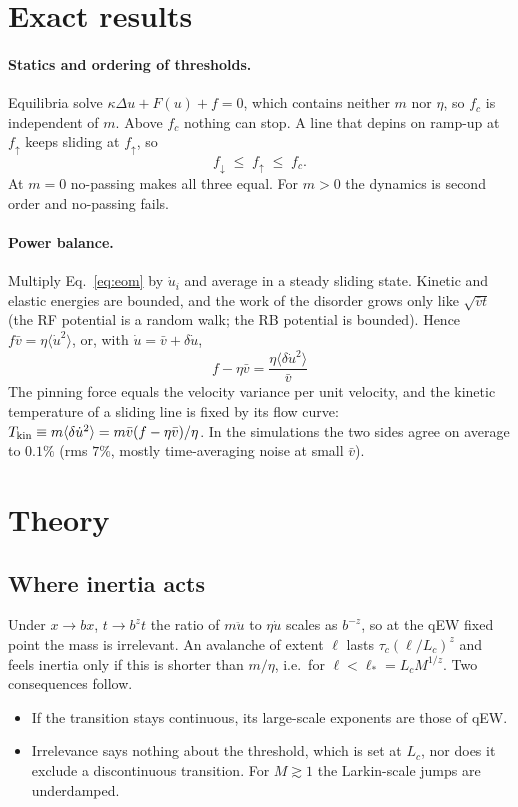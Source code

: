 \documentclass[10pt,a4paper]{article}
\newcommand{\fd}{f_\downarrow}
\newcommand{\fu}{f_\uparrow}
\newcommand{\fcs}{f_c}
\begin{document}
\section{Exact results}
\label{sec:exact}

\paragraph{Statics and ordering of thresholds.}
Equilibria solve $\kappa\Delta u+F(u)+f=0$, which contains neither $m$ nor $\eta$, so $\fcs$ is independent of $m$.
Above $\fcs$ nothing can stop.
A line that depins on ramp-up at $\fu$ keeps sliding at $\fu$, so
\begin{equation}
\fd\;\le\;\fu\;\le\;\fcs .
\end{equation}
At $m=0$ no-passing makes all three equal. For $m>0$ the dynamics is second order and no-passing fails.

\paragraph{Power balance.}
Multiply Eq.~\eqref{eq:eom} by $\dot u_i$ and average in a steady sliding state.
Kinetic and elastic energies are bounded, and the work of the disorder grows only like $\sqrt{\bar vt}$ (the RF potential is a random walk; the RB potential is bounded).
Hence $f\bar v=\eta\langle\dot u^2\rangle$, or, with $\dot u=\bar v+\delta\dot u$,
\begin{equation}
\boxed{\;f-\eta\bar v=\frac{\eta\langle\delta\dot u^2\rangle}{\bar v}\;}
\label{eq:identity}
\end{equation}
The pinning force equals the velocity variance per unit velocity, and the kinetic temperature of a sliding line is fixed by its flow curve: $T_{\rm kin}\equiv m\langle\delta\dot u^2\rangle=m\bar v(f-\eta\bar v)/\eta$.
In the simulations the two sides agree on average to $0.1\%$ (rms $7\%$, mostly time-averaging noise at small $\bar v$).

\section{Theory}
\label{sec:theory}

\subsection{Where inertia acts}

Under $x\to bx$, $t\to b^zt$ the ratio of $m\ddot u$ to $\eta\dot u$ scales as $b^{-z}$, so at the qEW fixed point the mass is irrelevant.
An avalanche of extent $\ell$ lasts $\tau_c(\ell/L_c)^z$ and feels inertia only if this is shorter than $m/\eta$, i.e.\ for $\ell<\ell_*=L_cM^{1/z}$.
Two consequences follow.
\begin{itemize}
\item If the transition stays continuous, its large-scale exponents are those of qEW.
\item Irrelevance says nothing about the threshold, which is set at $L_c$, nor does it exclude a discontinuous transition. For $M\gtrsim1$ the Larkin-scale jumps are underdamped.
\end{itemize}
\end{document}
